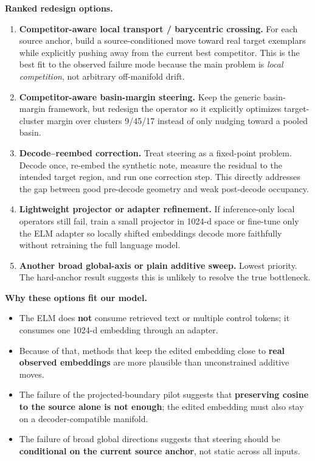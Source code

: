 \documentclass[11pt]{article}
\begin{document}
\textbf{Ranked redesign options.}
\begin{enumerate}[nosep]
  \item \textbf{Competitor-aware local transport / barycentric crossing.} For each source anchor, build a source-conditioned move toward real target exemplars while explicitly pushing away from the current best competitor. This is the best fit to the observed failure mode because the main problem is \emph{local competition}, not arbitrary off-manifold drift.
  \item \textbf{Competitor-aware basin-margin steering.} Keep the generic basin-margin framework, but redesign the operator so it explicitly optimizes target-cluster margin over clusters 9/45/17 instead of only nudging toward a pooled basin.
  \item \textbf{Decode--reembed correction.} Treat steering as a fixed-point problem. Decode once, re-embed the synthetic note, measure the residual to the intended target region, and run one correction step. This directly addresses the gap between good pre-decode geometry and weak post-decode occupancy.
  \item \textbf{Lightweight projector or adapter refinement.} If inference-only local operators still fail, train a small projector in 1024-d space or fine-tune only the ELM adapter so locally shifted embeddings decode more faithfully without retraining the full language model.
  \item \textbf{Another broad global-axis or plain additive sweep.} Lowest priority. The hard-anchor result suggests this is unlikely to resolve the true bottleneck.
\end{enumerate}

\textbf{Why these options fit our model.}
\begin{itemize}[nosep]
  \item The ELM does \textbf{not} consume retrieved text or multiple control tokens; it consumes one 1024-d embedding through an adapter.
  \item Because of that, methods that keep the edited embedding close to \textbf{real observed embeddings} are more plausible than unconstrained additive moves.
  \item The failure of the projected-boundary pilot suggests that \textbf{preserving cosine to the source alone is not enough}; the edited embedding must also stay on a decoder-compatible manifold.
  \item The failure of broad global directions suggests that steering should be \textbf{conditional on the current source anchor}, not static across all inputs.
\end{itemize}
\end{document}

